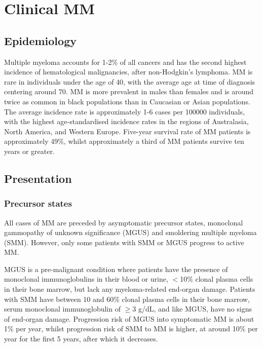\section{Clinical MM}

\subsection{Epidemiology}
Multiple myeloma accounts for 1-2\% of all cancers and has the second highest incidence of hematological malignancies, after non-Hodgkin's lymphoma\cite{international2003criteria}.
MM is rare in individuals under the age of 40, with the average age at time of diagnosis centering around 70\cite{tsang2019multiple, palumbo2011multiple}.
MM is more prevalent in males than females and is around twice as common in black populations than in Caucasian or Asian populations\cite{nhsmyeloma}.
The average incidence rate is approximately 1-6 cases per 100000 individuals\cite{tsang2019multiple, palumbo2011multiple, teras20162016}, with the highest age-standardised incidence rates in the regions of Australasia, North America, and Western Europe\cite{cowan2018global}.
Five-year survival rate of MM patients is approximately 49\%, whilst approximately a third of MM patients survive ten years or greater\cite{cancerresearchuk, siegel2016cancer}.

\subsection{Presentation}
\subsubsection{Precursor states}
All cases of MM are preceded by asymptomatic precursor states, monoclonal gammopathy of unknown significance (MGUS) and smoldering multiple myeloma (SMM).
However, only some patients with SMM or MGUS progress to active MM.

MGUS is a pre-malignant condition where patients have the presence of monoclonal immunoglobulins in their blood or urine, $<$10\% clonal plasma cells in their bone marrow, but lack any myeloma-related end-organ damage\cite{van2018mgus}.
Patients with SMM have between 10 and 60\% clonal plasma cells in their bone marrow, serum monoclonal immunoglobulin of $\ge$3 g/dL, and like MGUS, have no signs of end-organ damage\cite{rajkumar2015smoldering}.
Progression risk of MGUS into symptomatic MM is about 1\% per year, whilst progression risk of SMM to MM is higher, at around 10\% per year for the first 5 years, after which it decreases\cite{korde2011monoclonal, kyle2007clinical}.
%

